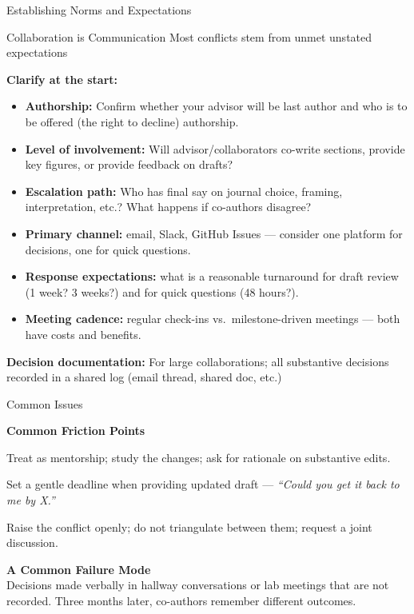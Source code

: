 \documentclass{beamer}
\begin{document}
\begin{frame}{Establishing Norms and Expectations}

    \footnotesize
    \begin{block}{Collaboration is Communication}
        Most conflicts stem from unmet unstated expectations
    \end{block}

    \medskip
  \textbf{Clarify at the start:}
  \begin{itemize}
    \item \textbf{Authorship:} Confirm whether your advisor
      will be last author and who is to be offered (the right to decline) authorship.
    \item \textbf{Level of involvement:} Will advisor/collaborators
      co-write sections, provide key figures, or provide feedback on drafts?
    \item \textbf{Escalation path:} Who has final say on journal
      choice, framing, interpretation, etc.?  What happens if co-authors disagree?
    \item \textbf{Primary channel:} email, Slack, GitHub Issues ---
      consider one platform for decisions, one for quick questions.
    \item \textbf{Response expectations:} what is a reasonable
      turnaround for draft review (1 week? 3 weeks?) and for quick questions (48 hours?).
    \item \textbf{Meeting cadence:} regular check-ins vs.\
      milestone-driven meetings --- both have costs and benefits.
  \end{itemize}

      \textbf{Decision documentation:} For large collaborations; all substantive decisions recorded in a shared log (email thread, shared doc, etc.)
\end{frame}


\begin{frame}{Common Issues}

  \footnotesize
  \textbf{Common Friction Points}
  \begin{description}
    \setlength{\itemsep}{4pt}
    \item[\textit{Advisor rewrites your draft:}]
      Treat as mentorship; study the changes;
      ask for rationale on substantive edits.
    \item[\textit{Co-author delays for weeks:}]
      Set a gentle deadline when providing updated draft ---
      \textit{``Could you get it back to me by X.''}
    \item[\textit{Co-authors disagree:}]
      Raise the conflict openly; do not triangulate
      between them; request a joint discussion.
  \end{description}

  \medskip
  \textbf{A Common Failure Mode}\\
  \smallskip
  Decisions made verbally in hallway conversations or lab meetings
  that are not recorded. Three months later, co-authors remember
  different outcomes.

\end{frame}
\end{document}
